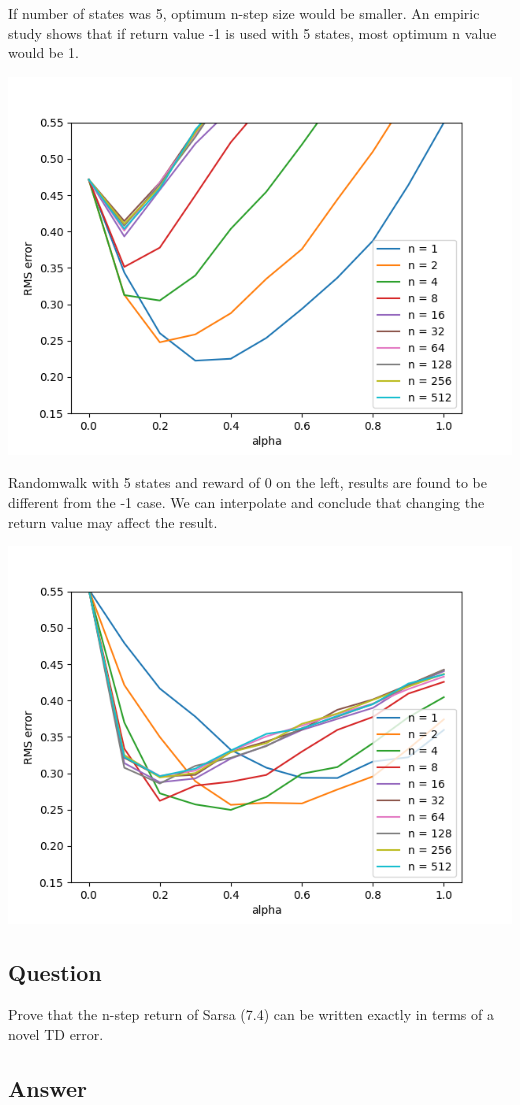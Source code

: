 \documentclass[11pt]{article}
\begin{document}
    If number of states was 5, optimum n-step size would be smaller.
    An empiric study shows that if return value -1 is used with 5 states, most optimum n value would be 1.

    \includegraphics[scale=0.4]{figure_7_3_5states_ret-1}

    Randomwalk with 5 states and reward of 0 on the left, results are found to be different from the -1 case.
    We can interpolate and conclude that changing the return value may affect the result.

    \includegraphics[scale=0.4]{figure_7_3_5states_ret0}

    \subsection{Question}

    Prove that the n-step return of Sarsa (7.4) can be written exactly in terms of a novel TD error.

    \subsection*{Answer}
\end{document}

